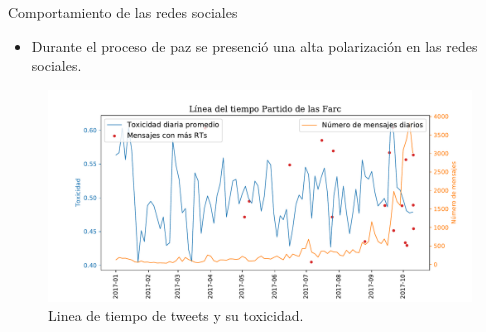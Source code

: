 \documentclass[11pt,usenames, dvipsnames]{beamer}
\begin{document}
\begin{frame}{Comportamiento de las redes sociales}
    \begin{itemize}
        \item Durante el proceso de paz se presenció una alta polarización en las redes sociales. 
    \end{itemize}
    \begin{figure}
        \includegraphics[width=\textwidth]{figures/tweets}
        \caption{Linea de tiempo de tweets y su toxicidad.}
    \end{figure}
\end{frame}
\end{document}
